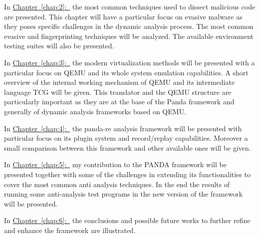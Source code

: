 \medskip
In \hyperref[chap:2]{Chapter~\ref*{chap:2}:~} the most common techniques used to dissect malicious code are presented. This chapter will have a particular focus on evasive malware as they poses specific challenges in the dynamic analysis process. The most common evasive and fingerprinting techniques will be analyzed. The available environment testing suites will also be presented. 


\medskip
In \hyperref[chap:3]{Chapter~\ref*{chap:3}:~} the modern virtualization methods will be presented with a particular focus on QEMU and its whole system emulation capabilities. A short overview of the internal working mechanism of QEMU and its intermediate language TCG will be given. This translator and the QEMU structure are particularly important as they are at the base of the Panda framework and generally of dynamic analysis frameworks based on QEMU.


\medskip
In \hyperref[chap:4]{Chapter~\ref*{chap:4}:~} the panda-re analysis framework will be presented with particular focus on its plugin system and record/replay capabilities. Moreover a small comparison between this framework and other available ones will be given. 


\medskip
In \hyperref[chap:5]{Chapter~\ref*{chap:5}:~}  my contribution to the PANDA framework will be presented together with some of the challenges in extending its functionalities to cover the most common anti analysis techniques. In the end the results of running some anti-analysis test programs in the new version of the framework will be presented.

\medskip
In \hyperref[chap:6]{Chapter~\ref*{chap:6}:~} the conclusions and possible future works to further refine and enhance the framework are illustrated.